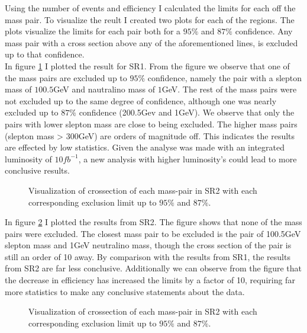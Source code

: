 \documentclass{article}
\begin{document}
\egroup
Using the number of events and efficiency I calculated the limits for each off the mass pair. To visualize the reult I created two plots for each of the regions. The plots visualize the limits for each pair both for a $95\%$ and $87\%$ confidence. Any mass pair with a cross section above any of the aforementioned lines, is excluded up to that confidence. 
\\
In figure \ref{fig:ExlusionSR1} I plotted the result for SR1. From the figure we observe that one of the mass pairs are excluded up to $95\%$ confidence, namely the pair with a slepton mass of $100.5$GeV and nautralino mass of $1$GeV. The rest of the mass pairs were not excluded up to the same degree of confidence, although one was nearly excluded up to $87\%$ confidence (200.5Gev and 1GeV). We observe that only the pairs with lower slepton mass are close to being excluded. The higher mass pairs (slepton mass > 300GeV) are orders of magnitude off. This indicates the results are effected by low statistics. Given the analyse was made with an integrated luminosity of $10fb^{-1}$, a new analysis with higher luminosity's could lead to more conclusive results.
\\
\begin{figure}
     \caption{Visualization of crossection of each mass-pair in SR2 with each corresponding exclusion limit up to $95\%$ and $87\%$.}
     \label{fig:ExlusionSR1}
\end{figure}
In figure \ref{fig:ExlusionSR2} I plotted the results from SR2. The figure shows that none of the mass pairs were excluded. The closest mass pair to be excluded is the pair of 100.5GeV slepton mass and 1GeV neutralino mass, though the cross section of the pair is still an order of 10 away. By comparison with the results from SR1, the results from SR2 are far less conclusive. Additionally we can observe from the figure that the decrease in efficiency has increased the limits by a factor of 10, requiring far more statistics to make any conclusive statements about the data. \\
\begin{figure}
     \caption{Visualization of crossection of each mass-pair in SR2 with each corresponding exclusion limit up to $95\%$ and $87\%$.}
     \label{fig:ExlusionSR2}
\end{figure}
\end{document}
